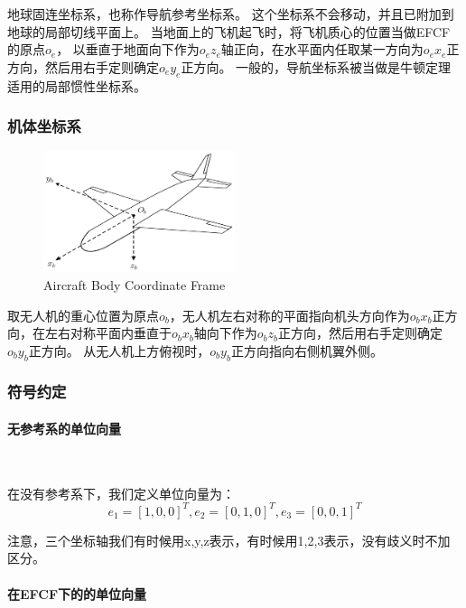 \documentclass{article} %
\numberwithin{equation}{section} %
\begin{document}
地球固连坐标系，也称作导航参考坐标系。
这个坐标系不会移动，并且已附加到地球的局部切线平面上。
当地面上的飞机起飞时，将飞机质心的位置当做EFCF的原点$o_e$，
以垂直于地面向下作为$o_e z_e$轴正向，在水平面内任取某一方向为$o_e x_e$正方向，然后用右手定则确定$o_e y_e$正方向。
一般的，导航坐标系被当做是牛顿定理适用的局部惯性坐标系。

\subsubsection{机体坐标系}
\begin{figure}[htbp]
\centering
\includegraphics[width=0.50\textwidth]{aircraft_body_coordinate.pdf}
\caption{Aircraft Body Coordinate Frame}
\end{figure}

取无人机的重心位置为原点$o_b$，无人机左右对称的平面指向机头方向作为$o_b x_b$正方向，在左右对称平面内垂直于$o_b x_b$轴向下作为$o_b z_b$正方向，然后用右手定则确定$o_b y_b$正方向。
从无人机上方俯视时，$o_b y_b$正方向指向右侧机翼外侧。

\subsubsection{符号约定}

\paragraph{无参考系的单位向量}~

在没有参考系下，我们定义单位向量为：
\begin{equation}
e_1=[1,0,0]^T, e_2=[0,1,0]^T, e_3=[0,0,1]^T
\end{equation}

注意，三个坐标轴我们有时候用x,y,z表示，有时候用1,2,3表示，没有歧义时不加区分。

\paragraph{在EFCF下的的单位向量}~
\end{document}
